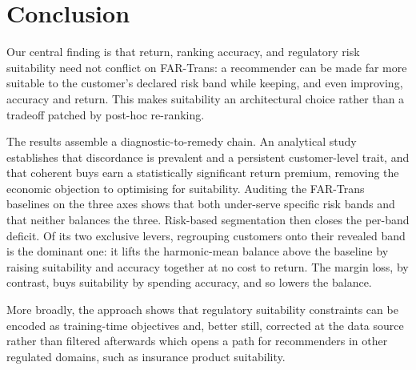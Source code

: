 \section{Conclusion}
\label{sec:conclusion}

Our central finding is that return, ranking accuracy, and regulatory risk suitability need not conflict on FAR-Trans: a recommender can be made far more suitable to the customer's declared risk band while keeping, and even improving, accuracy and return. This makes suitability an architectural choice rather than a tradeoff patched by post-hoc re-ranking.

The results assemble a diagnostic-to-remedy chain. An analytical study establishes that discordance is prevalent and a persistent customer-level trait, and that coherent buys earn a statistically significant return premium, removing the economic objection to optimising for suitability. Auditing the FAR-Trans baselines on the three axes shows that both under-serve specific risk bands and that neither balances the three. Risk-based segmentation then closes the per-band deficit. Of its two exclusive levers, regrouping customers onto their revealed band is the dominant one: it lifts the harmonic-mean balance above the baseline by raising suitability and accuracy together at no cost to return. The margin loss, by contrast, buys suitability by spending accuracy, and so lowers the balance.

More broadly, the approach shows that regulatory suitability constraints can be encoded as training-time objectives and, better still, corrected at the data source rather than filtered afterwards which opens a path for recommenders in other regulated domains, such as insurance product suitability.
